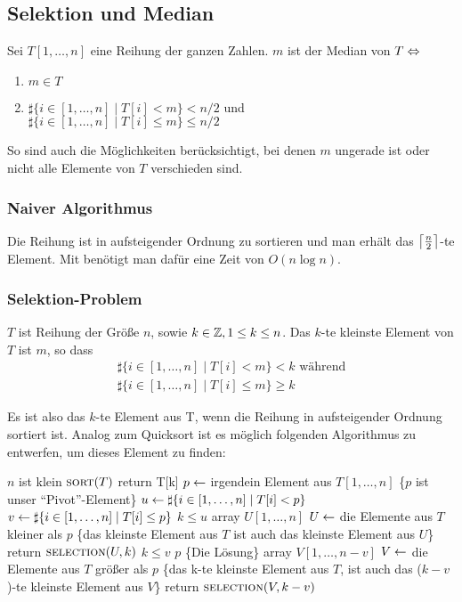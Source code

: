 \documentclass[a4paper]{scrartcl}
\begin{document}

\subsection{Selektion und Median}
Sei $T[1, \ldots, n]$ eine Reihung der ganzen Zahlen. $m$ ist der Median von $T \Leftrightarrow$

\begin{enumerate}
	\item $m \in T$
	\item $\sharp\{i \in [1, \ldots, n] \mid T[i] < m \} < n/2$ und \\
				$\sharp\{i \in [1, \ldots, n] \mid T[i] \leq m\} \leq n/2$
\end{enumerate}
So sind auch die Möglichkeiten berücksichtigt, bei denen  $m$ ungerade ist oder nicht alle Elemente von $T$ verschieden sind.

\subsubsection{Naiver Algorithmus}
Die Reihung ist in aufsteigender Ordnung zu sortieren und man erhält das $\left\lceil\frac{n}{2}\right\rceil$-te Element.
Mit  benötigt man dafür eine Zeit von $O(n \log n)$.

\subsubsection{Selektion-Problem}
$T$ ist Reihung der Größe $n$, sowie $k \in \mathbb{Z}, 1 \leq k \leq n$. Das $k$-te kleinste Element von $T$ ist $m$, so dass
$$\begin{array}{l}
	\sharp\{i \in [1, \ldots, n] \mid T[i] < m \} < k \text{ während} \\
	\sharp\{i \in [1, \ldots, n] \mid T[i] \leq m\} \geq k
\end{array}$$

Es ist also das $k$-te Element aus T, wenn die Reihung in aufsteigender Ordnung sortiert ist.
Analog zum Quicksort ist es möglich folgenden Algorithmus zu entwerfen, um dieses Element zu finden:

\begin{codebox}
\li \If $n$ ist klein
\li		\Then $\textnormal{\scshape sort}(T)$
\li 				return T[k]
		\End
\li $p \leftarrow$ irgendein Element aus $T[1, \ldots, n]$
\zi \{$p$ ist unser "`Pivot"'-Element\}
\li	$u \leftarrow \sharp\{i \in [1, \ldots, n] \mid T[i] < p \}$
\li	$v \leftarrow \sharp\{i \in [1, \ldots, n] \mid T[i] \leq p \}$
\li \If $k \leq u$
\li 	\Then array $U[1, \ldots, n]$
\li 	$U \leftarrow$ die Elemente aus $T$ kleiner als $p$
\zi 	\{das kleinste Element aus $T$ ist auch das kleinste Element aus $U$\}
\li		return $\textnormal{\scshape selection}(U,k)$
		\End
\li \If $k \leq v$
\li 	\Then \Return $p$ \{Die Lösung\}
\li 	\Else array $V[1, \ldots, n-v]$
\li 				$V \leftarrow$ die Elemente aus $T$ größer als $p$
\zi 				\{das k-te kleinste Element aus $T$, ist auch das ($k-v$)-te kleinste Element aus $V$\}
\li 				return $\textnormal{\scshape selection}(V, k-v)$
		\End
\end{codebox}
\end{document}
